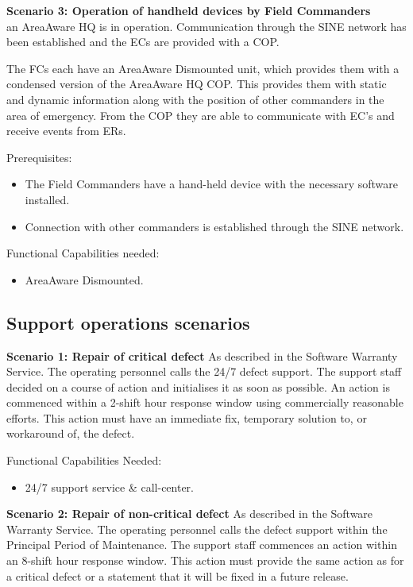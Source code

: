 \vspace{20pt}
\noindent \textbf{Scenario 3: Operation of handheld devices by Field Commanders} \\
an AreaAware HQ is in operation. Communication through the SINE network has been established and the ECs are provided with a COP. 

The FCs each have an AreaAware Dismounted unit, which provides them with a condensed version of the AreaAware HQ COP. This provides them with static and dynamic information along with the position of other commanders in the area of emergency. From the COP they are able to communicate with EC's and receive events from ERs.

\noindent Prerequisites:
\begin{itemize}
	\itemsep0em
	\item The Field Commanders have a hand-held device with the necessary software installed.
	\item Connection with other commanders is  established through the SINE network.
\end{itemize}

\noindent Functional Capabilities needed:
\begin{itemize}
	\item AreaAware Dismounted.
\end{itemize}

\subsection{Support operations scenarios}
\noindent \textbf{Scenario 1: Repair of critical defect}
As described in the Software Warranty Service.
The operating personnel calls the 24/7 defect support. The support staff decided on a course of action and initialises it as soon as possible. An action is commenced within a 2-shift hour response window using commercially reasonable efforts. This action must have an immediate fix, temporary solution to, or workaround of, the defect.

\noindent Functional Capabilities Needed:
\begin{itemize}
	\item 24/7 support service \& call-center.
\end{itemize}

\vspace{20pt}
\noindent \textbf{Scenario 2: Repair of non-critical defect}
As described in the Software Warranty Service.
The operating personnel calls the defect support within the Principal Period of Maintenance. The support staff commences an action within an 8-shift hour response window. This action must provide the same action as for a critical defect or a statement that it will be fixed in a future release. \\

